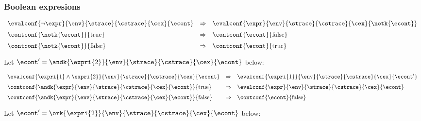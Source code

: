 \documentclass{article}
\begin{document}
\subsubsection{Boolean expresions}
\newcommand{\true}{\mathrm{true}}
\newcommand{\false}{\mathrm{false}}

\[
  \begin{array}{lll}
	\evalconf{\neg\expr}{\env}{\strace}{\cstrace}{\cex}{\econt}
	& \Rightarrow &
	\evalconf{\expr}{\env}{\strace}{\cstrace}{\cex}{\notk{\econt}}\\[2mm]

	\contconf{\notk{\econt}}{\true}
	& \Rightarrow &
	\contconf{\econt}{\false}\\[2mm]

	\contconf{\notk{\econt}}{\false}
	& \Rightarrow &
	\contconf{\econt}{\true}
  \end{array}
\]

\noindent
Let $\econt' = \andk{\expri{2}}{\env}{\strace}{\cstrace}{\cex}{\econt}$ below:

\[
  \begin{array}{lcl}
	\evalconf{\expri{1} \land \expri{2}}{\env}{\strace}{\cstrace}{\cex}{\econt}
	& \Rightarrow &
	\evalconf{\expri{1}}{\env}{\strace}{\cstrace}{\cex}{\econt'}\\[2mm]

	\contconf{\andk{\expr}{\env}{\strace}{\cstrace}{\cex}{\econt}}{\true}
	& \Rightarrow &
	\evalconf{\expr}{\env}{\strace}{\cstrace}{\cex}{\econt}\\[2mm]

	\contconf{\andk{\expr}{\env}{\strace}{\cstrace}{\cex}{\econt}}{\false}
	& \Rightarrow &
	\contconf{\econt}{\false}\\
  \end{array}
\]

\noindent
Let $\econt' = \ork{\expri{2}}{\env}{\strace}{\cstrace}{\cex}{\econt}$ below:
\end{document}
